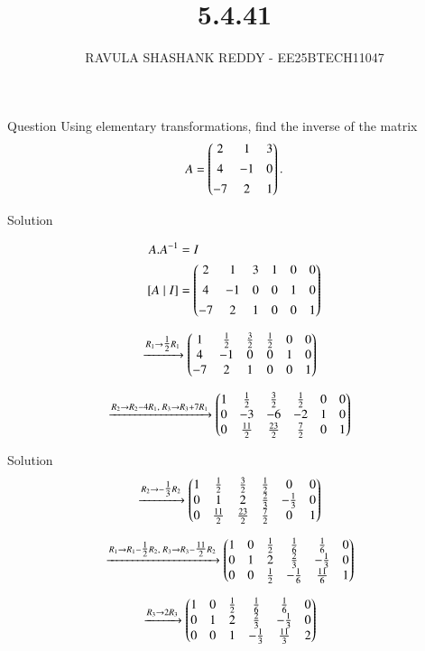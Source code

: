 \documentclass{beamer}
\title %
{5.4.41}
\author %
{RAVULA SHASHANK REDDY - EE25BTECH11047}
\begin{document}
	
	
	\frame{\titlepage}
	\begin{frame}{Question}
    Using elementary transformations, find the inverse of the matrix
\begin{align*}
    A=\begin{pmatrix}2 & 1 & 3 \\[4pt] 4 & -1 & 0 \\[4pt] -7 & 2 & 1\end{pmatrix}.
\end{align*}

\end{frame}
\begin{frame}{Solution}

    \begin{align}
    A.A^{-1}&=I\\
    [A\mid I] &= 
\begin{pmatrix}2 & 1 & 3 & 1 & 0 & 0 \\[4pt]
       4 & -1 & 0 & 0 & 1 & 0 \\[4pt]
      -7 & 2 & 1 & 0 & 0 & 1\end{pmatrix}
\end{align}

\begin{align}
&\xrightarrow{R_1 \to \tfrac12 R_1}
\begin{pmatrix}1 & \tfrac12 & \tfrac32 & \tfrac12 & 0 & 0 \\
       4 & -1 & 0 & 0 & 1 & 0 \\
      -7 & 2 & 1 & 0 & 0 & 1\end{pmatrix}
\end{align}

\begin{align}
&\xrightarrow{R_2 \to R_2-4R_1,\; R_3 \to R_3+7R_1}
\begin{pmatrix}1 & \tfrac12 & \tfrac32 & \tfrac12 & 0 & 0 \\
       0 & -3 & -6 & -2 & 1 & 0 \\
       0 & \tfrac{11}{2} & \tfrac{23}{2} & \tfrac{7}{2} & 0 & 1\end{pmatrix}
\end{align}

\end{frame}
\begin{frame}{Solution}
\begin{align}
&\xrightarrow{R_2 \to -\tfrac13 R_2}
\begin{pmatrix}1 & \tfrac12 & \tfrac32 & \tfrac12 & 0 & 0 \\
       0 & 1 & 2 & \tfrac23 & -\tfrac13 & 0 \\
       0 & \tfrac{11}{2} & \tfrac{23}{2} & \tfrac{7}{2} & 0 & 1\end{pmatrix}
\end{align}

\begin{align}
&\xrightarrow{R_1 \to R_1-\tfrac12R_2,\; R_3 \to R_3-\tfrac{11}{2}R_2}
\begin{pmatrix}1 & 0 & \tfrac12 & \tfrac16 & \tfrac16 & 0 \\
       0 & 1 & 2 & \tfrac23 & -\tfrac13 & 0 \\
       0 & 0 & \tfrac12 & -\tfrac16 & \tfrac{11}{6} & 1\end{pmatrix}
\end{align}

\begin{align}
&\xrightarrow{R_3 \to 2R_3}
\begin{pmatrix}1 & 0 & \tfrac12 & \tfrac16 & \tfrac16 & 0 \\
       0 & 1 & 2 & \tfrac23 & -\tfrac13 & 0 \\
       0 & 0 & 1 & -\tfrac13 & \tfrac{11}{3} & 2\end{pmatrix}
\end{align}
\end{frame}
\end{document}
